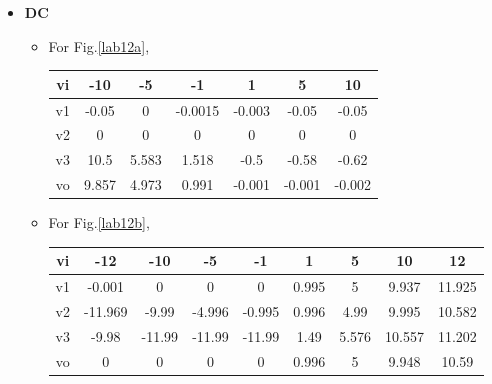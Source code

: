 \begin{itemize}
            \item \textbf{DC}
                \begin{itemize}
                    \item For Fig.\ref{lab12a},\\
                        \begin{table}[h]
                        \centering
                        \begin{tabular}{|c|c|c|c|c|c|c|}
                            \hline
                            vi & -10   & -5    & -1      & 1      & 5      & 10     \\ \hline
                            v1 & -0.05 & 0     & -0.0015 & -0.003 & -0.05  & -0.05  \\ \hline
                            v2 & 0     & 0     & 0       & 0      & 0      & 0      \\ \hline
                            v3 & 10.5  & 5.583 & 1.518   & -0.5   & -0.58  & -0.62  \\ \hline
                            vo & 9.857 & 4.973 & 0.991   & -0.001 & -0.001 & -0.002 \\ \hline
                        \end{tabular}
                        \end{table}
                        \FloatBarrier
                    \item For Fig.\ref{lab12b},\\
                        \begin{table}[h]
                        \centering
                        \begin{tabular}{|c|c|c|c|c|c|c|c|c|}
                            \hline
                            vi & -12     & -10    & -5     & -1     & 1     & 5     & 10     & 12     \\ \hline
                            v1 & -0.001  & 0      & 0      & 0      & 0.995 & 5     & 9.937  & 11.925 \\ \hline
                            v2 & -11.969 & -9.99  & -4.996 & -0.995 & 0.996 & 4.99  & 9.995  & 10.582 \\ \hline
                            v3 & -9.98   & -11.99 & -11.99 & -11.99 & 1.49  & 5.576 & 10.557 & 11.202 \\ \hline
                            vo & 0       & 0      & 0      & 0      & 0.996 & 5     & 9.948  & 10.59  \\ \hline
                        \end{tabular}
                        \end{table}
                        \FloatBarrier
                \end{itemize}
            
        \end{itemize}
